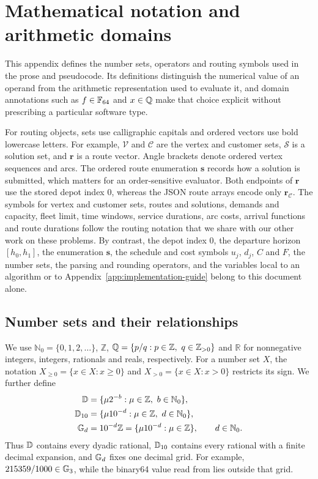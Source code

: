 \section{Mathematical notation and arithmetic domains}\label{app:notation}
This appendix defines the number sets, operators and routing symbols used in the prose and pseudocode. Its definitions distinguish the numerical value of an operand from the arithmetic representation used to evaluate it, and domain annotations such as $f\in\mathbb{F}_{64}$ and $x\in\mathbb{Q}$ make that choice explicit without prescribing a particular software type.

For routing objects, sets use calligraphic capitals and ordered vectors use bold lowercase letters. For example, $\mathcal{V}$ and $\mathcal{C}$ are the vertex and customer sets, $\mathcal{S}$ is a solution set, and $\mathbf{r}$ is a route vector. Angle brackets denote ordered vertex sequences and arcs. The ordered route enumeration $\mathbf{s}$ records how a solution is submitted, which matters for an order-sensitive evaluator. Both endpoints of $\mathbf{r}$ use the stored depot index 0, whereas the JSON route arrays encode only $\mathbf{r}_{\mathcal{C}}$. The symbols for vertex and customer sets, routes and solutions, demands and capacity, fleet limit, time windows, service durations, arc costs, arrival functions and route durations follow the routing notation that we share with our other work on these problems. By contrast, the depot index 0, the departure horizon $[h_0,h_1]$, the enumeration $\mathbf{s}$, the schedule and cost symbols $u_j$, $d_j$, $C$ and $F$, the number sets, the parsing and rounding operators, and the variables local to an algorithm or to Appendix~\ref{app:implementation-guide} belong to this document alone.

\subsection{Number sets and their relationships}
We use $\mathbb{N}_0=\{0,1,2,\ldots\}$, $\mathbb{Z}$, $\Q=\{p/q:p\in\mathbb{Z},\ q\in\mathbb{Z}_{>0}\}$ and $\mathbb{R}$ for nonnegative integers, integers, rationals and reals, respectively. For a number set $X$, the notation $X_{\geq0}=\{x\in X:x\geq0\}$ and $X_{>0}=\{x\in X:x>0\}$ restricts its sign. We further define
\begin{align}
\mathbb{D}&=\{\mu2^{-b}:\mu\in\mathbb{Z},\ b\in\mathbb{N}_0\},\\
\mathbb{D}_{10}&=\{\mu10^{-d}:\mu\in\mathbb{Z},\ d\in\mathbb{N}_0\},\\
\mathbb{G}_{d}&=10^{-d}\mathbb{Z}=\{\mu10^{-d}:\mu\in\mathbb{Z}\},\qquad d\in\mathbb{N}_0.
\end{align}
Thus $\mathbb{D}$ contains every dyadic rational, $\mathbb{D}_{10}$ contains every rational with a finite decimal expansion, and $\mathbb{G}_{d}$ fixes one decimal grid. For example, $215359/1000\in\mathbb{G}_{3}$, while the binary64 value read from  lies outside that grid.

